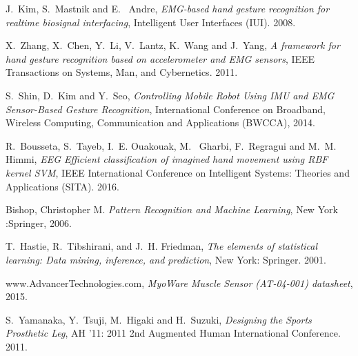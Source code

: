 \documentclass[conference]{IEEEtran}
\begin{document}
\begin{thebibliography}{1}
J.~Kim, S.~Mastnik and E.~ Andre, \emph{EMG-based hand gesture recognition for realtime biosignal interfacing}, Intelligent User Interfaces (IUI). 2008.

X.~Zhang, X.~Chen, Y.~Li, V.~Lantz, K.~Wang and J.~Yang, \emph{A framework for hand gesture recognition based on accelerometer and EMG sensors}, IEEE Transactions on Systems, Man, and Cybernetics. 2011.

S.~Shin, D.~Kim and Y.~Seo, \emph{Controlling Mobile Robot Using IMU and EMG Sensor-Based Gesture Recognition}, International Conference on Broadband, Wireless Computing, Communication and Applications (BWCCA), 2014.

R.~Bousseta, S.~Tayeb, I.~E. Ouakouak, M.~ Gharbi, F.~Regragui and M.~M. Himmi, \emph{EEG Efficient classification of imagined hand
movement using RBF kernel SVM}, IEEE International Conference on Intelligent Systems: Theories and Applications (SITA). 2016.

Bishop, Christopher M. \emph{Pattern Recognition and Machine Learning}, New York :Springer, 2006.

T.~Hastie, R.~Tibshirani, and J.~H. Friedman, \emph{The elements of statistical learning: Data mining, inference, and prediction}, New York: Springer. 2001.

www.AdvancerTechnologies.com, \emph{MyoWare Muscle Sensor (AT-04-001) datasheet}, 2015.

S.~Yamanaka, Y.~Tsuji, M.~Higaki and H.~Suzuki, \emph{Designing the Sports Prosthetic Leg}, AH '11: 2011 2nd Augmented Human International Conference. 2011.



\end{thebibliography}
\end{document}
